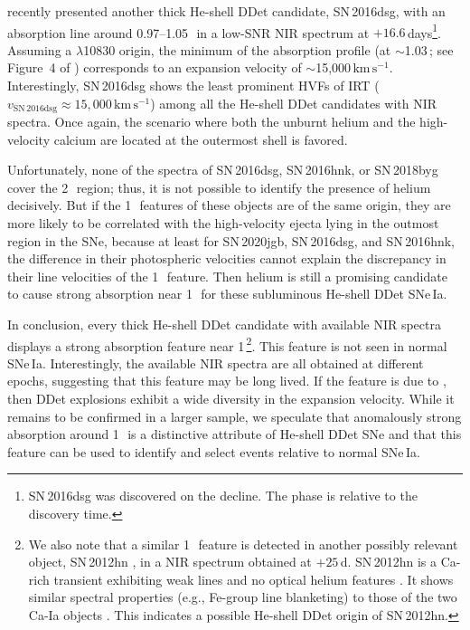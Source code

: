 \documentclass[twocolumn]{aastex631}
\newcommand{\sn}{SN\,2020jgb}
\newcommand{\kms}{$\mathrm{km}\,\mathrm{s}^{-1}$}
\begin{document}
\citet{Dong_16dsg_2022} recently presented another thick He-shell DDet candidate, SN\,2016dsg, with an absorption line around 0.97--1.05\,\micron\ in a low-SNR NIR spectrum at $+16.6$\,days\footnote{SN\,2016dsg was discovered on the decline. The phase is relative to the discovery time.}. Assuming a  $\lambda$10830 origin, the minimum of the absorption profile (at $\sim$1.03\,\micron; see Figure~4 of \citealp{Dong_16dsg_2022}) corresponds to an expansion velocity of $\sim$15,000\,\kms. Interestingly, SN\,2016dsg shows the least prominent HVFs of  IRT ($v_\mathrm{SN\,2016dsg} \approx 15,000$\,\kms) among all the He-shell DDet candidates with NIR spectra. Once again, the scenario where both the unburnt helium and the high-velocity calcium are located at the outermost shell is favored.

Unfortunately, none of the spectra of SN\,2016dsg, SN\,2016hnk, or SN\,2018byg cover the 2\,\micron\ region; thus, it is not possible to identify the presence of helium decisively. But if the 1\,\micron\ features of these objects are of the same origin, they are more likely to be correlated with the high-velocity ejecta lying in the outmost region in the SNe, because at least for \sn, SN\,2016dsg, and SN\,2016hnk, the difference in their photospheric velocities cannot explain the discrepancy in their line velocities of the 1\,\micron\ feature. Then helium is still a promising candidate to cause strong absorption near 1\,\micron\ for these subluminous He-shell DDet SNe\,Ia.

In conclusion, every thick He-shell DDet candidate with available NIR spectra displays a strong absorption feature near 1\,\micron\footnote{We also note that a similar 1\,\micron\ feature is detected in another possibly relevant object, SN\,2012hn \citep{Valenti_12hn_2014}, in a NIR spectrum obtained at $+25$\,d. SN\,2012hn is a Ca-rich transient exhibiting weak  lines and no optical helium features \citep[thus termed as a Ca-Ic object by][]{De_Ca-rich_2020}. It shows similar spectral properties (e.g., Fe-group line blanketing) to those of the two Ca-Ia objects \citep{De_Ca-rich_2020}. This indicates a possible He-shell DDet origin of SN\,2012hn.}. 
This feature is not seen in normal SNe\,Ia. Interestingly, the available NIR spectra are all obtained at different epochs, suggesting that this feature may be long lived. If the feature is due to , then DDet explosions exhibit a wide diversity in the expansion velocity. While it remains to be confirmed in a larger sample, we speculate that anomalously strong absorption around 1\,\micron\ is a distinctive attribute of He-shell DDet SNe and that this feature can be used to identify and select events relative to normal SNe\,Ia.
\end{document}
